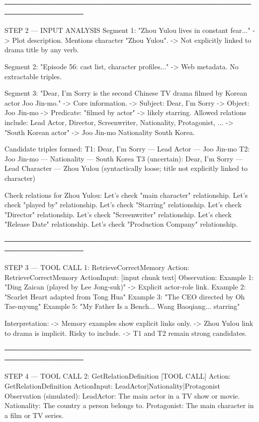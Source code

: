 \begin{appendices}
\begin{tcolorbox}[tracebox, title=Model Reasoning Trace]
──────────────────────────────────────────────────────────────────

STEP 2 — INPUT ANALYSIS
  Segment 1: "Zhou Yulou lives in constant fear..."
    -> Plot description. Mentions character "Zhou Yulou".
    -> Not explicitly linked to drama title by any verb.

  Segment 2: "Episode 56: cast list, character profiles..."
    -> Web metadata. No extractable triples.

  Segment 3: "Dear, I'm Sorry is the second Chinese TV drama
              filmed by Korean actor Joo Jin-mo."
    -> Core information.
    -> Subject: Dear, I'm Sorry
    -> Object:  Joo Jin-mo
    -> Predicate: "filmed by actor" -> likely starring.
       Allowed relations include: Lead Actor, Director,
       Screenwriter, Nationality, Protagonist, ...
    -> "South Korean actor" -> Joo Jin-mo Nationality South Korea.

  Candidate triples formed:
    T1: Dear, I'm Sorry — Lead Actor — Joo Jin-mo
    T2: Joo Jin-mo — Nationality — South Korea
    T3 (uncertain): Dear, I'm Sorry — Lead Character — Zhou Yulou
       (syntactically loose; title not explicitly linked to character)

  Check relations for Zhou Yulou:
    Let's check "main character" relationship.
    Let's check "played by" relationship.
    Let's check "Starring" relationship.
    Let's check "Director" relationship.
    Let's check "Screenwriter" relationship.
    Let's check "Release Date" relationship.
    Let's check "Production Company" relationship.

──────────────────────────────────────────────────────────────────

STEP 3 — TOOL CALL 1: RetrieveCorrectMemory
  Action:      RetrieveCorrectMemory
  ActionInput: [input chunk text]
  Observation:
    Example 1: "Ding Zaican (played by Lee Jong-suk)"
               -> Explicit actor-role link.
    Example 2: "Scarlet Heart adapted from Tong Hua"
    Example 3: "The CEO directed by Oh Tae-myung"
    Example 5: "My Father Is a Bench... Wang Baoqiang... starring"

  Interpretation:
    -> Memory examples show explicit links only.
    -> Zhou Yulou link to drama is implicit. Risky to include.
    -> T1 and T2 remain strong candidates.

──────────────────────────────────────────────────────────────────

STEP 4 — TOOL CALL 2: GetRelationDefinition          [TOOL CALL]
  Action:      GetRelationDefinition
  ActionInput: LeadActor|Nationality|Protagonist
  Observation (simulated):
    LeadActor:   The main actor in a TV show or movie.
    Nationality: The country a person belongs to.
    Protagonist: The main character in a film or TV series.


\end{tcolorbox}
\end{appendices}
